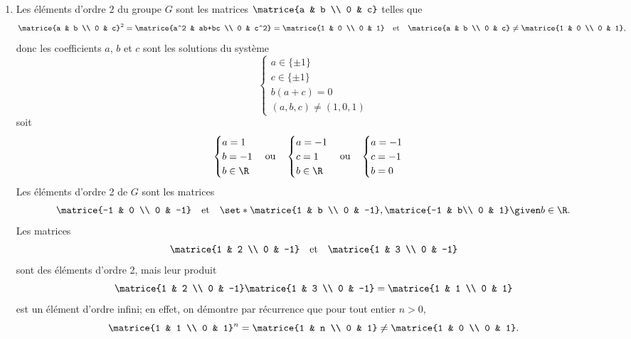 \begin{enumerate}
    \item
      Les éléments d'ordre $2$ du groupe $G$ sont les matrices
      $\matrice{a & b \\ 0 & c}$ telles que
      \[
        \matrice{a & b \\ 0 & c}^2
        = \matrice{a^2 & ab+bc \\ 0 & c^2}
        = \matrice{1 & 0 \\ 0 & 1}
        \quad\text{et}\quad
        \matrice{a & b \\ 0 & c}\neq\matrice{1 & 0 \\ 0 & 1},
      \]
    donc les coefficients $a$, $b$ et $c$ sont les solutions du système
    \[
        \begin{cases}
          a \in\{\pm 1\}\\
          c \in\{\pm 1\}\\
          b(a+c) = 0\\
          (a,b,c) \neq (1,0,1)
        \end{cases}
    \]
    soit
    \[
      \begin{cases}
        a = 1\\
        b = -1\\
        b \in \R
      \end{cases}
      \text{ou}\quad
      \begin{cases}
        a = -1\\
        c = 1\\
        b \in \R
      \end{cases}
      \text{ou}\quad
      \begin{cases}
        a = -1\\
        c = -1\\
        b = 0
      \end{cases}
    \]
    Les éléments d'ordre 2 de $G$ sont les matrices
    \[
      \matrice{-1 & 0 \\ 0 & -1}
      \quad\text{et}\quad
      \set*{\matrice{1 & b \\ 0 & -1}, \matrice{-1 & b\\ 0 & 1} \given b\in\R}.
    \]
    Les matrices
    \[
      \matrice{1 & 2 \\ 0 & -1}
      \quad\text{et}\quad
      \matrice{1 & 3 \\ 0 & -1}
    \]
    sont des éléments d'ordre 2, mais leur produit
    \[
      \matrice{1 & 2 \\ 0 & -1} \matrice{1 & 3 \\ 0 & -1}
      = \matrice{1 & 1 \\ 0 & 1}
    \]
    est un élément d'ordre infini; en effet, on démontre par récurrence que
    pour tout entier $n>0$,
    \[
      \matrice{1 & 1 \\ 0 & 1}^n =
        \matrice{1 & n \\ 0 & 1} \neq \matrice{1 & 0 \\ 0 & 1}.
    \]
\end{enumerate}


